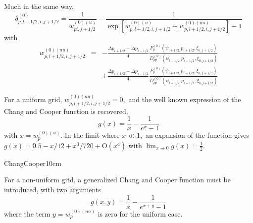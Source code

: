 Much in the same way,
\begin{equation}
\delta _{p,l+1/2,i,j+1/2}^{\left( 0\right) }=\frac{1}{w_{pi,j+1/2}^{\left(
0\right) (u)}}-\frac{1}{\exp \left[ w_{p,l+1/2,i,j+1/2}^{\left( 0\right)
(u)}+w_{p,l+1/2,i,j+1/2}^{\left( 0\right) (nu)}\right] -1}
\end{equation}
with
\begin{eqnarray}
w_{p,l+1/2,i,j+1/2}^{\left( 0\right) (nu)} &=&-\frac{\Delta p_{i+1/2}-\Delta %
p_{i-1/2}}{4}\frac{F_{p}^{\left( 0\right) }\left( \psi
_{l+1/2,}p_{i+1/2},\xi _{0,j+1/2}\right) }{D_{pp}^{\left( 0\right) }\left(
\psi _{l+1/2,}p_{i+1/2},\xi _{0,j+1/2}\right) }  \nonumber \\
&&+\frac{\Delta p_{i+1/2}-\Delta p_{i-1/2}}{4}\frac{F_{p}^{\left( 0\right)
}\left( \psi _{l+1/2,}p_{i-1/2},\xi _{0,j+1/2}\right) }{D_{pp}^{\left(
0\right) }\left( \psi _{l+1/2,}p_{i-1/2},\xi _{0,j+1/2}\right) }
\end{eqnarray}

For a uniform grid, $w_{p,l+1/2,i,j+1/2}^{\left( 0\right) (nu)}=0,$ and the
well known expression of the Chang and Cooper function is recovered,
\begin{equation}
g\left( x\right) =\frac{1}{x}-\frac{1}{e^{x}-1}
\end{equation}
with $x=w_{p}^{\left( 0\right) (u)}.$ In the limit where $x\ll 1,$ an
expansion of the function gives $g\left( x\right) =0.5-x/12+x^{3}/720+%
\mathrm{O}\left( x^{4}\right) $ with $\lim_{x\rightarrow 0}g\left( x\right) =%
\frac{1}{2}.$

 {ChangCooper}{10cm}%

For a non-uniform grid, a generalized Chang and Cooper function must be
introduced, with two arguments
\begin{equation}
g\left( x,y\right) =\frac{1}{x}-\frac{1}{e^{x+y}-1}
\end{equation}
where the term $y=w_{p}^{\left( 0\right) (nu)}$ is zero for the uniform case.

